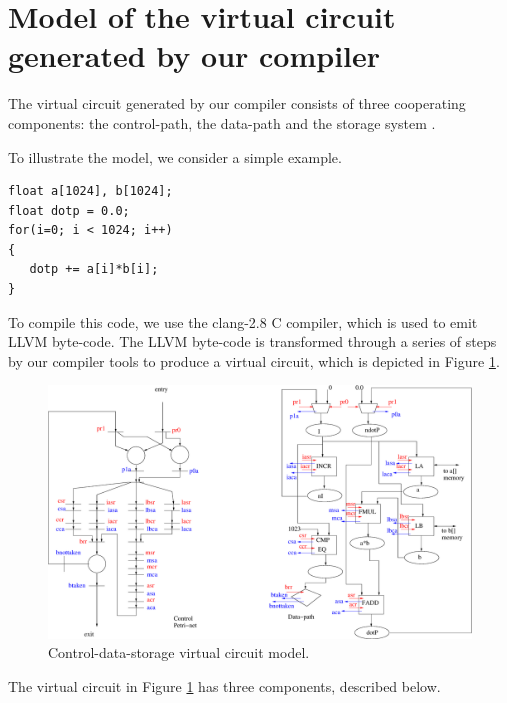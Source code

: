 \documentclass[conference]{IEEEtran}
\begin{document}



\section{Model of the virtual circuit generated by our compiler}

The virtual circuit generated by our compiler consists of three
cooperating components: the control-path, the data-path and
the storage system \cite{ahirDsd2010}.

To illustrate the model, we consider a simple example.
\begin{verbatim}
float a[1024], b[1024];
float dotp = 0.0;
for(i=0; i < 1024; i++)
{
   dotp += a[i]*b[i];
}
\end{verbatim}
To compile this code, we use the clang-2.8  C compiler, 
which is used to emit LLVM byte-code.  The LLVM byte-code
is transformed through a series of steps by our compiler tools to
produce a virtual circuit, which is depicted in Figure \ref{fig:dotP}.
\begin{figure}[ht]
  \centering
  \includegraphics[width=15cm]{dotP.eps}
  \caption{Control-data-storage virtual circuit model.}
  \label{fig:dotP}
\end{figure}
The virtual circuit in Figure \ref{fig:dotP} has three components,
described below.
\end{document}
